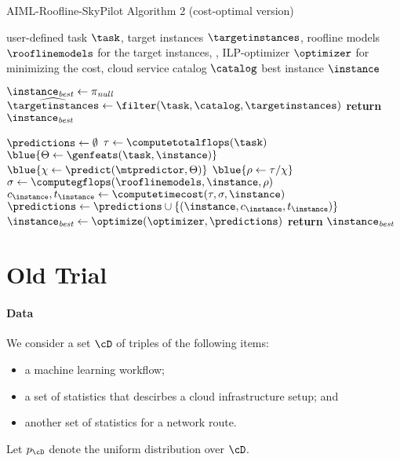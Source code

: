 \documentclass[runningheads]{llncs}
\begin{document}
\begin{algorithm}[h]
	\caption{AIML-Roofline-SkyPilot Algorithm 2 (cost-optimal version)}
	\label{alg:aiml-roofline-skypilot-2}
	\begin{algorithmic}[1]
		\Require user-defined task $\task$, target instances $\targetinstances$, roofline models $\rooflinemodels$ for the target instances, , ILP-optimizer $\optimizer$ for minimizing the cost, cloud service catalog $\catalog$
		\Ensure best instance $\instance$%
		
		\State $\instance_{\it best} \gets \pi_{\it null}$
		\State $\widehat{\targetinstances} \gets \filter(\task, \catalog, \targetinstances)$
		\If{$\widehat{\targetinstances}$ = $\emptyset$}
		\State \textbf{return} $\instance_{\it best}$
		\EndIf
		
		\State $\predictions \gets \emptyset$
		\State $\tau \gets \computetotalflops(\task)$
		\ForAll{$\instance \in \widehat{\targetinstances}$}
		\State $\blue{\Theta \gets \genfeats(\task, \instance)}$
		\State $\blue{\chi \gets \predict(\mtpredictor, \Theta)}$
		\State $\blue{\rho \gets \tau / \chi}$
		\State $\sigma \gets \computegflops(\rooflinemodels, \instance, \rho)$
		\State $c_\instance, t_\instance \gets \computetimecost(\tau, \sigma, \instance)$
		\State $\predictions \gets \predictions \cup \{(\instance, c_\instance, t_\instance)\}$
		\EndFor
		\State $\instance_{\it best}  \gets \optimize(\optimizer, \predictions)$
		\State \textbf{return} $\instance_{\it best}$%
	\end{algorithmic}
\end{algorithm}







\iffalse
\section{Old Trial}

\paragraph{Data}
We consider a set $ \cD$ of triples of the following items:
\begin{itemize}
	\item a machine learning workflow;
	\item a set of statistics that descirbes a cloud infrastructure setup; and
	\item another set of statistics for a network route.
\end{itemize}
Let $p_\cD$ denote the uniform distribution over $\cD$.
\end{document}
